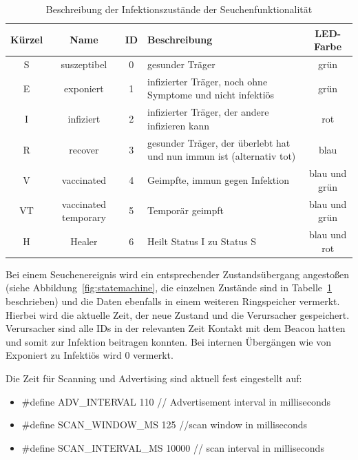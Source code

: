 \documentclass[11pt,ngerman]{scrartcl} %
\begin{document}
\begin{table}[h]
  \centering
  \begin{tabular}{cccp{7cm}c}
    Kürzel & Name & ID & Beschreibung & LED-Farbe \\\hline
    S & suszeptibel & 0 & gesunder Träger & grün \\
    E & exponiert & 1 & infizierter Träger, noch ohne Symptome und nicht infektiös & grün \\
    I & infiziert & 2 & infizierter Träger, der andere infizieren kann & rot \\
    R & recover & 3 & gesunder Träger, der überlebt hat und nun immun ist (alternativ tot) & blau \\
    V & vaccinated & 4 &Geimpfte, immun gegen Infektion & blau und grün \\
    VT & vaccinated temporary & 5 & Temporär geimpft & blau und grün \\
    H & Healer & 6 & Heilt Status I zu Status S & blau und rot \\
  \end{tabular}
  \caption{Beschreibung der Infektionszustände der Seuchenfunktionalität}
  \label{tab:infectioninfo}
\end{table}

Bei einem Seuchenereignis wird ein entsprechender Zustandsübergang angestoßen (siehe Abbildung~\ref{fig:statemachine}, die einzelnen Zustände sind in Tabelle~\ref{tab:infectioninfo} beschrieben) und die Daten ebenfalls in einem weiteren Ringspeicher vermerkt. Hierbei wird die aktuelle Zeit, der neue Zustand und die Verursacher gespeichert. Verursacher sind alle IDs in der relevanten Zeit Kontakt mit dem Beacon hatten und somit zur Infektion beitragen konnten. Bei internen Übergängen wie von Exponiert zu Infektiös wird 0 vermerkt.

Die Zeit für Scanning und Advertising sind aktuell fest eingestellt auf:
\begin{itemize}
\item \#define ADV\_INTERVAL				110 // Advertisement interval in milliseconds
\item \#define SCAN\_WINDOW\_MS				125  //scan window in milliseconds
\item \#define SCAN\_INTERVAL\_MS			10000  // scan interval in milliseconds
\end{itemize}
\end{document}
